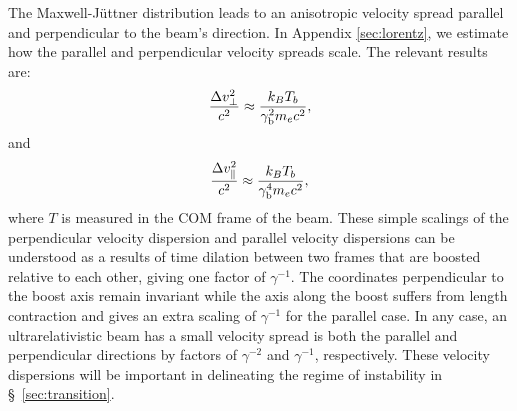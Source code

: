 \documentclass[usenatbib,iop,apj,numberedappendix]{aeb_emulateapj_2015}
\newcommand\ab[1]{{\color{green} \bf #1}} %
\newcommand{\gammabeam}{\ensuremath{\gamma_{\rm b}}}
\begin{document}

The Maxwell-J{\"u}ttner distribution leads to an anisotropic velocity spread parallel and perpendicular to the beam's direction.  In Appendix \ref{sec:lorentz}, we estimate how the parallel and perpendicular velocity spreads scale.  The relevant results are: 
\begin{equation}\label{eq:perp dispersion}
\frac{\Delta v_{\perp}^2}{c^2} \approx \frac {k_B T_b}{\gammabeam^2 m_e c^2 },
\end{equation}
and 
\begin{equation}\label{eq:parallel dispersion}
\frac{\Delta v_{\parallel}^2}{c^2} \approx \frac {k_B T_b}{\gammabeam^4 m_e c^2 },
\end{equation}
where $T$ is measured in the COM frame of the beam.  
These simple scalings of the perpendicular velocity dispersion and parallel velocity dispersions can be understood as a results of time dilation between two frames that are boosted relative to each other, giving one factor of $\gamma^{-1}$. The coordinates perpendicular to the boost axis remain invariant while the axis along the boost suffers from length contraction and gives an extra scaling of $\gamma^{-1}$ for the parallel case.  In any case, an ultrarelativistic beam has a small velocity spread is both the parallel and perpendicular directions by factors of $\gamma^{-2}$ and $\gamma^{-1}$, respectively.  These velocity dispersions will be important in delineating the regime of instability in \S~\ref{sec:transition}. 


\end{document}

